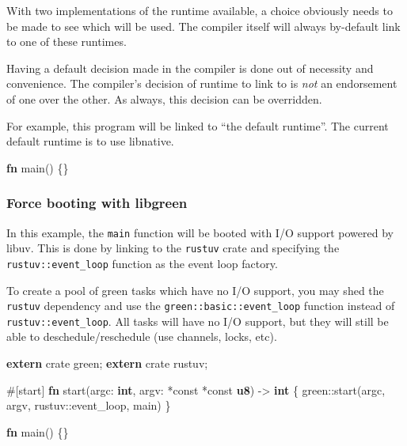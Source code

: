 \documentclass[]{article}
\newenvironment{Shaded}{}{}
\newcommand{\KeywordTok}[1]{\textcolor[rgb]{0.00,0.44,0.13}{\textbf{{#1}}}}
\newcommand{\OtherTok}[1]{\textcolor[rgb]{0.00,0.44,0.13}{{#1}}}
\newcommand{\NormalTok}[1]{{#1}}
\begin{document}
With two implementations of the runtime available, a choice obviously
needs to be made to see which will be used. The compiler itself will
always by-default link to one of these runtimes.

Having a default decision made in the compiler is done out of necessity
and convenience. The compiler's decision of runtime to link to is
\emph{not} an endorsement of one over the other. As always, this
decision can be overridden.

For example, this program will be linked to ``the default runtime''. The
current default runtime is to use libnative.

\begin{Shaded}
\begin{Highlighting}[]
\KeywordTok{fn} \NormalTok{main() \{\}}
\end{Highlighting}
\end{Shaded}

\subsubsection{Force booting with
libgreen}\label{force-booting-with-libgreen}

In this example, the \texttt{main} function will be booted with I/O
support powered by libuv. This is done by linking to the \texttt{rustuv}
crate and specifying the \texttt{rustuv::event\_loop} function as the
event loop factory.

To create a pool of green tasks which have no I/O support, you may shed
the \texttt{rustuv} dependency and use the
\texttt{green::basic::event\_loop} function instead of
\texttt{rustuv::event\_loop}. All tasks will have no I/O support, but
they will still be able to deschedule/reschedule (use channels, locks,
etc).

\begin{Shaded}
\begin{Highlighting}[]
\KeywordTok{extern} \NormalTok{crate green;}
\KeywordTok{extern} \NormalTok{crate rustuv;}

\OtherTok{#[}\NormalTok{start}\OtherTok{]}
\KeywordTok{fn} \NormalTok{start(argc: }\KeywordTok{int}\NormalTok{, argv: *const *const }\KeywordTok{u8}\NormalTok{) -> }\KeywordTok{int} \NormalTok{\{}
    \NormalTok{green::start(argc, argv, rustuv::event_loop, main)}
\NormalTok{\}}

\KeywordTok{fn} \NormalTok{main() \{\}}
\end{Highlighting}
\end{Shaded}
\end{document}
